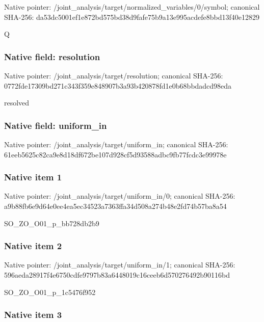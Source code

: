 \documentclass[10pt,a4paper]{article}
\begin{document}
Native pointer: /joint\_analysis/target/n\allowbreak{}ormalized\_variables/0/sy\allowbreak{}mbol; canonical SHA-256: da53dc5001ef1e872bd575bd\allowbreak{}38d9fafe75b9a13e995acdef\allowbreak{}e8bbd13f40e12829


Q


\subsubsection{Native field: resolution}


Native pointer: /joint\_analysis/target/resolution; canonical SHA-256: 0772fde17309bd271c343f35\allowbreak{}9e848907b3a93b420878fd1e\allowbreak{}0b68bbdadcd98eda


resolved


\subsubsection{Native field: uniform\_in}


Native pointer: /joint\_analysis/target/uniform\_in; canonical SHA-256: 61eeb5625c82ca9e8d18df67\allowbreak{}2be107d928cf5d93588adbc9\allowbreak{}fb77fcdc3e99978e



\subsubsection{Native item 1}


Native pointer: /joint\_analysis/target/uniform\_in/0; canonical SHA-256: a9b88fb6e9d64e0ee4ea5ec3\allowbreak{}4523a7363ffa34d508a274b4\allowbreak{}8e2fd74b57ba8a54


SO\_ZO\_O01\_p\_bb728db2b9


\subsubsection{Native item 2}


Native pointer: /joint\_analysis/target/uniform\_in/1; canonical SHA-256: 596aeda28917f4e6750cdfe9\allowbreak{}797b83a6448019c16ceeb6d5\allowbreak{}70276492b90116bd


SO\_ZO\_O01\_p\_1c5476f952


\subsubsection{Native item 3}
\end{document}
